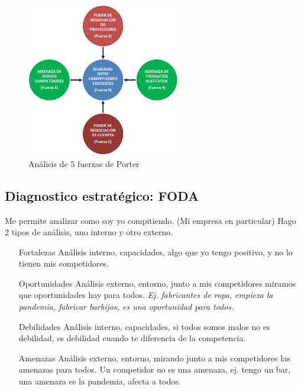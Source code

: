 \documentclass[titlepage,a4paper]{article}
\begin{document}
\begin{figure}[!htb]
    \centering
    \includegraphics[width=0.6\textwidth]{imagenes/5FuerzasPorter.png}
    \caption{Análisis de 5 fuerzas de Porter}
\end{figure}

\newpage 

\subsection{Diagnostico estratégico: FODA}
Me permite analizar como soy yo compitiendo. (Mi empresa en particular) Hago 2 tipos de análisis, uno interno y otro externo.

\begin{itemize}
    \item[Fortalezas] Análisis interno, capacidades, algo que yo tengo positivo, y no lo tienen mis competidores. 
    \item[Oportunidades] Análisis externo, entorno, junto a mis competidores miramos que oportunidades hay para todos. \textit{Ej. fabricantes de ropa, empieza la pandemia, fabricar barbijos, es una oportunidad para todos.}
    \item[Debilidades] Análisis interno, capacidades, si todos somos malos no es debilidad, es debilidad cuando te diferencia de la competencia.
    \item[Amenazas] Análisis externo, entorno, mirando junto a mis competidores las amenazas para todos. Un competidor no es una amenaza, ej. tengo un bar, una amenaza es la pandemia, afecta a todos.
\end{itemize}
\end{document}

